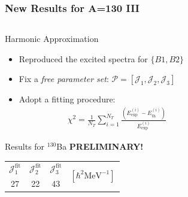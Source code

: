 \documentclass{beamer}
\begin{document}
\begin{frame}
  \frametitle{New Results for A=130 III}
  \begin{columns}
    \begin{column}{0.75\textwidth}
      \begin{alertblock}{Harmonic Approximation}
        \begin{itemize}
          \item Reproduced the excited spectra for $\{B1,B2\}$
          \item Fix a \emph{free parameter set}: $\mathcal{P}=\left[\mathcal{J}_1,\mathcal{J}_2,\mathcal{J}_3\right]$
          \item Adopt a fitting procedure:
          \begin{align}
            \chi^2=\frac{1}{N_T}\sum_{i=1}^{N_T}\frac{\left(E_\text{exp}^{(i)}-E_\text{th}^{(i)}\right)}{E_\text{exp}^{(i)}}
          \end{align}
        \end{itemize}
      \end{alertblock}
      \begin{exampleblock}{Results for $^{130}$Ba \textbf{PRELIMINARY!}}
        \begin{table}
          \centering
          \begin{tabular}{|c|c|c|c|}
          \hline
          $\mathcal{J}_1^\text{fit}$ & $\mathcal{J}_2^\text{fit}$ & $\mathcal{J}_3^\text{fit}$ & \multirow{2}{*}{$\left[\hbar^2\text{MeV}^{-1}\right]$} \\ \cline{1-3}
          27                         & 22                         & 43                         &                                                       \\ \hline
          \end{tabular}
          \end{table}
      \end{exampleblock}
  \end{column}
  \begin{column}{0.25\textwidth}
    \begin{figure}
      \centering

\end{figure}
\end{column}
\end{columns}
\end{frame}
\end{document}
